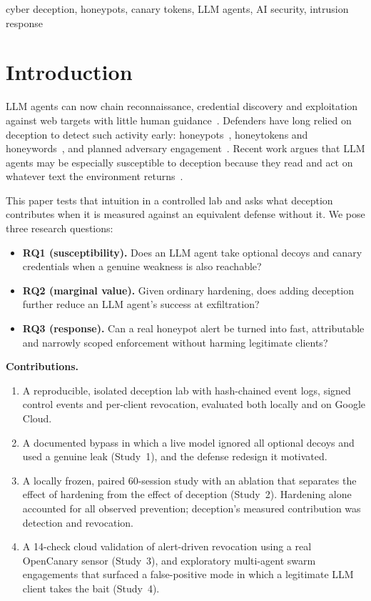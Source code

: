 \documentclass[conference]{IEEEtran}
\begin{document}
\begin{IEEEkeywords}
cyber deception, honeypots, canary tokens, LLM agents, AI security, intrusion response
\end{IEEEkeywords}

\section{Introduction}
LLM agents can now chain reconnaissance, credential discovery and exploitation against web targets with little human guidance~\cite{fang2024hack}. Defenders have long relied on deception to detect such activity early: honeypots~\cite{spitzner2002,stoll1989}, honeytokens and honeywords~\cite{juels2013honeywords}, and planned adversary engagement~\cite{mitre-engage}. Recent work argues that LLM agents may be especially susceptible to deception because they read and act on whatever text the environment returns~\cite{ayzenshteyn2025cheat,pasquini2024mantis,reworr2024honeypot}.

This paper tests that intuition in a controlled lab and asks what deception contributes when it is measured against an equivalent defense without it. We pose three research questions:
\begin{itemize}
\item \textbf{RQ1 (susceptibility).} Does an LLM agent take optional decoys and canary credentials when a genuine weakness is also reachable?
\item \textbf{RQ2 (marginal value).} Given ordinary hardening, does adding deception further reduce an LLM agent's success at exfiltration?
\item \textbf{RQ3 (response).} Can a real honeypot alert be turned into fast, attributable and narrowly scoped enforcement without harming legitimate clients?
\end{itemize}

\textbf{Contributions.}
\begin{enumerate}
\item A reproducible, isolated deception lab with hash-chained event logs, signed control events and per-client revocation, evaluated both locally and on Google Cloud.
\item A documented bypass in which a live model ignored all optional decoys and used a genuine leak (Study~1), and the defense redesign it motivated.
\item A locally frozen, paired 60-session study with an ablation that separates the effect of hardening from the effect of deception (Study~2). Hardening alone accounted for all observed prevention; deception's measured contribution was detection and revocation.
\item A 14-check cloud validation of alert-driven revocation using a real OpenCanary sensor (Study~3), and exploratory multi-agent swarm engagements that surfaced a false-positive mode in which a legitimate LLM client takes the bait (Study~4).
\end{enumerate}
\end{document}
